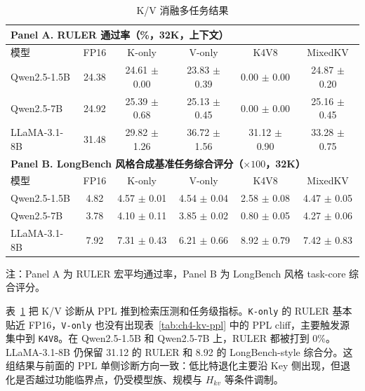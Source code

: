 \begin{table}[H]
  \centering
  \caption{K/V 消融多任务结果}
  \label{tab:ch4-kv-multitask}
  {%
  \footnotesize
  \setlength{\tabcolsep}{4pt}
  \renewcommand{\arraystretch}{1.05}
  \begin{tabular}{lccccc}
    \toprule
    \multicolumn{6}{l}{\textbf{Panel A. RULER 通过率（\%，32K，上下文）}} \\
    \midrule
    模型 & FP16 & K-only & V-only & K4V8 & MixedKV \\
    \midrule
    Qwen2.5-1.5B & 24.38 & 24.61 $\pm$ 0.00 & 23.83 $\pm$ 0.39 & 0.00 $\pm$ 0.00 & 24.87 $\pm$ 0.20 \\
    Qwen2.5-7B   & 24.92 & 25.39 $\pm$ 0.68 & 25.13 $\pm$ 0.45 & 0.00 $\pm$ 0.00 & 25.16 $\pm$ 0.45 \\
    LLaMA-3.1-8B & 31.48 & 29.82 $\pm$ 1.26 & 36.72 $\pm$ 1.56 & 31.12 $\pm$ 0.90 & 33.28 $\pm$ 0.75 \\
    \midrule
    \multicolumn{6}{l}{\textbf{Panel B. LongBench 风格合成基准任务综合评分（$\times 100$，32K）}} \\
    \midrule
    模型 & FP16 & K-only & V-only & K4V8 & MixedKV \\
    \midrule
    Qwen2.5-1.5B & 4.82 & 4.57 $\pm$ 0.01 & 4.54 $\pm$ 0.04 & 2.58 $\pm$ 0.08 & 4.47 $\pm$ 0.05 \\
    Qwen2.5-7B   & 3.78 & 4.10 $\pm$ 0.11 & 3.85 $\pm$ 0.02 & 0.80 $\pm$ 0.05 & 4.27 $\pm$ 0.06 \\
    LLaMA-3.1-8B & 7.92 & 7.31 $\pm$ 0.43 & 6.21 $\pm$ 0.66 & 8.92 $\pm$ 0.79 & 7.42 $\pm$ 0.83 \\
    \bottomrule
  \end{tabular}

  \vspace{0.35em}
  \begin{minipage}{0.94\linewidth}
    \footnotesize
    注：Panel A 为 RULER 宏平均通过率，Panel B 为 LongBench 风格 task-core 综合评分。
  \end{minipage}
  }
\end{table}

表~\ref{tab:ch4-kv-multitask} 把 K/V 诊断从 PPL 推到检索压测和任务级指标。\texttt{K-only} 的 RULER 基本贴近 FP16，\texttt{V-only} 也没有出现表~\ref{tab:ch4-kv-ppl} 中的 PPL cliff，主要触发源集中到 \texttt{K4V8}。在 Qwen2.5-1.5B 和 Qwen2.5-7B 上，RULER 都被打到 0\%。LLaMA-3.1-8B 仍保留 31.12 的 RULER 和 8.92 的 LongBench-style 综合分。这组结果与前面的 PPL 单侧诊断方向一致：低比特退化主要沿 Key 侧出现，但退化是否越过功能临界点，仍受模型族、规模与 $H_{kv}$ 等条件调制。

